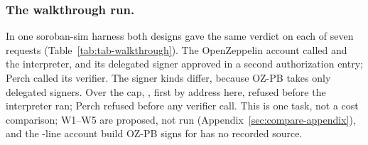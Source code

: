 \subsubsection{The walkthrough run.}\label{sec:compare-run} In one soroban-sim
harness both designs gave the same verdict on each of seven requests
(Table~\ref{tab:tab-walkthrough}). The OpenZeppelin account called
 and the interpreter, and its delegated signer approved in a
second authorization entry; Perch called its verifier. The signer kinds differ,
because OZ-PB takes only delegated signers. Over the cap, ,
first by address here, refused before the interpreter ran; Perch refused before
any verifier call. This is one task, not a cost comparison; W1--W5 are proposed,
not run (Appendix~\ref{sec:compare-appendix}), and the -line
account build OZ-PB signs for has no recorded source.

